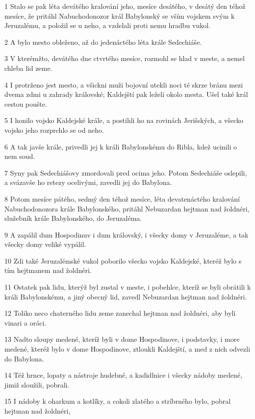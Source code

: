 \par 1 Stalo se pak léta devátého kralování jeho, mesíce desátého, v desátý den téhož mesíce, že pritáhl Nabuchodonozor král Babylonský se vším vojskem svým k Jeruzalému, a položil se u neho, a vzdelali proti nemu hradbu vukol.
\par 2 A bylo mesto obleženo, až do jedenáctého léta krále Sedechiáše.
\par 3 V kterémžto, devátého dne ctvrtého mesíce, rozmohl se hlad v meste, a nemel chleba lid zeme.
\par 4 I protrženo jest mesto, a všickni muži bojovní utekli noci té skrze bránu mezi dvema zdmi u zahrady královské; Kaldejští pak leželi okolo mesta. Ušel také král cestou poušte.
\par 5 I honilo vojsko Kaldejské krále, a postihli ho na rovinách Jerišských, a všecko vojsko jeho rozprchlo se od neho.
\par 6 A tak javše krále, privedli jej k králi Babylonskému do Ribla, kdež ucinili o nem soud.
\par 7 Syny pak Sedechiášovy zmordovali pred ocima jeho. Potom Sedechiáše oslepili, a svázavše ho retezy ocelivými, zavedli jej do Babylona.
\par 8 Potom mesíce pátého, sedmý den téhož mesíce, léta devatenáctého kralování Nabuchodonozora krále Babylonského, pritáhl Nebuzardan hejtman nad žoldnéri, služebník krále Babylonského, do Jeruzaléma.
\par 9 A zapálil dum Hospodinuv i dum královský, i všecky domy v Jeruzaléme, a tak všecky domy veliké vypálil.
\par 10 Zdi také Jeruzalémské vukol poborilo všecko vojsko Kaldejské, kteréž bylo s tím hejtmanem nad žoldnéri.
\par 11 Ostatek pak lidu, kterýž byl zustal v meste, i pobehlce, kteríž se byli obrátili k králi Babylonskému, a jiný obecný lid, zavedl Nebuzardan hejtman nad žoldnéri.
\par 12 Toliko neco chaterného lidu zeme zanechal hejtman nad žoldnéri, aby byli vinari a oráci.
\par 13 Nadto sloupy medené, kteríž byli v dome Hospodinove, i podstavky, i more medené, kteréž bylo v dome Hospodinove, ztloukli Kaldejští, a med z nich odvezli do Babylona.
\par 14 Též hrnce, lopaty a nástroje hudebné, a kadidlnice i všecky nádoby medené, jimiž sloužili, pobrali.
\par 15 I nádoby k oharkum a kotlíky, a cokoli zlatého a stríbrného bylo, pobral hejtman nad žoldnéri,

